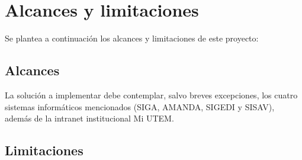 \section{Alcances y limitaciones}

Se plantea a continuación los alcances y limitaciones de este proyecto:

\subsection{Alcances}

La solución a implementar debe contemplar, salvo breves excepciones, los cuatro sistemas informáticos mencionados (SIGA, AMANDA, SIGEDI y SISAV), además de la intranet institucional Mi UTEM.


\subsection{Limitaciones}
\lipsum[5]

